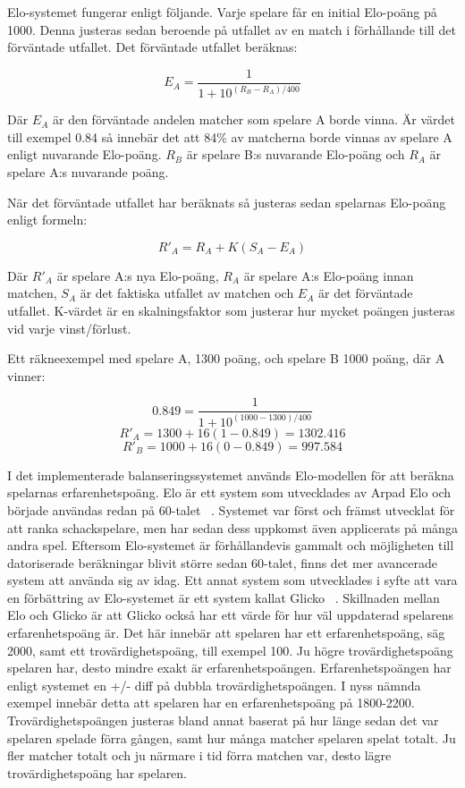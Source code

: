 \documentclass[a4paper, 11pt]{article}
\begin{document}
Elo-systemet fungerar enligt följande. Varje spelare får en initial Elo-poäng på 1000. Denna justeras sedan beroende på utfallet av en match i förhållande till det förväntade utfallet. Det förväntade utfallet beräknas:

$$E_A = \frac{1}{1+10^{(R_B-R_A)/400}}$$

Där $E_A$ är den förväntade andelen matcher som spelare A borde vinna. Är värdet till exempel 0.84 så innebär det att 84\% av matcherna borde vinnas av spelare A enligt nuvarande Elo-poäng. $R_B$ är spelare B:s nuvarande Elo-poäng och $R_A$ är spelare A:s nuvarande poäng.

När det förväntade utfallet har beräknats så justeras sedan spelarnas Elo-poäng enligt formeln:

$$R'_A = R_A + K(S_A-E_A)$$

Där $R'_A$ är spelare A:s nya Elo-poäng, $R_A$ är spelare A:s Elo-poäng innan matchen, $S_A$ är det faktiska utfallet av matchen och $E_A$ är det förväntade utfallet. K-värdet är en skalningsfaktor som justerar hur mycket poängen justeras vid varje vinst/förlust.

Ett räkneexempel med spelare A, 1300 poäng, och spelare B 1000 poäng, där A vinner:

$$0.849 = \frac{1}{1+10^{(1000-1300)/400}}$$
$$ R'_A = 1300 + 16(1-0.849) = 1302.416 $$
$$ R'_B = 1000 + 16(0-0.849) = 997.584 $$

I det implementerade balanseringssystemet används Elo-modellen för att beräkna spelarnas erfarenhetspoäng. Elo är ett system som utvecklades av Arpad Elo och började användas redan på 60-talet ~\cite{elo}. Systemet var först och främst utvecklat för att ranka schackspelare, men har sedan dess uppkomst även applicerats på många andra spel. Eftersom Elo-systemet är förhållandevis gammalt och möjligheten till datoriserade beräkningar blivit större sedan 60-talet, finns det mer avancerade system att använda sig av idag. Ett annat system som utvecklades i syfte att vara en förbättring av Elo-systemet är ett system kallat Glicko ~\cite{chessratings}. Skillnaden mellan Elo och Glicko är att Glicko också har ett värde för hur väl uppdaterad spelarens erfarenhetspoäng är. Det här innebär att spelaren har ett erfarenhetspoäng, säg 2000, samt ett trovärdighetspoäng, till exempel 100. Ju högre trovärdighetspoäng spelaren har, desto mindre exakt är erfarenhetspoängen. Erfarenhetspoängen har enligt systemet en +/- diff på dubbla trovärdighetspoängen. I nyss nämnda exempel innebär detta att spelaren har en erfarenhetspoäng på 1800-2200. Trovärdighetspoängen justeras bland annat baserat på hur länge sedan det var spelaren spelade förra gången, samt hur många matcher spelaren spelat totalt. Ju fler matcher totalt och ju närmare i tid förra matchen var, desto lägre trovärdighetspoäng har spelaren.
\end{document}
